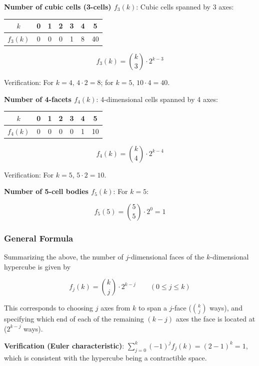 \documentclass[
  a4paper,11pt]{article}
\newcounter{none}
\theoremstyle{definition}
\theoremstyle{remark}
\begin{document}
\textbf{Number of cubic cells (3-cells) \(f_3(k)\)}: Cubic cells spanned
by 3 axes:

{\def\LTcaptype{none} %
\begin{longtable}[]{@{}ccccccc@{}}
\toprule\noalign{}
\(k\) & 0 & 1 & 2 & 3 & 4 & 5 \\
\midrule\noalign{}
\endhead
\bottomrule\noalign{}
\endlastfoot
\(f_3(k)\) & 0 & 0 & 0 & 1 & 8 & 40 \\
\end{longtable}
}

\[f_3(k) = \binom{k}{3} \cdot 2^{k-3}\]

Verification: For \(k=4\), \(4 \cdot 2 = 8\); for \(k=5\),
\(10 \cdot 4 = 40\).

\textbf{Number of 4-facets \(f_4(k)\)}: 4-dimensional cells spanned by 4
axes:

{\def\LTcaptype{none} %
\begin{longtable}[]{@{}ccccccc@{}}
\toprule\noalign{}
\(k\) & 0 & 1 & 2 & 3 & 4 & 5 \\
\midrule\noalign{}
\endhead
\bottomrule\noalign{}
\endlastfoot
\(f_4(k)\) & 0 & 0 & 0 & 0 & 1 & 10 \\
\end{longtable}
}

\[f_4(k) = \binom{k}{4} \cdot 2^{k-4}\]

Verification: For \(k=5\), \(5 \cdot 2 = 10\).

\textbf{Number of 5-cell bodies \(f_5(k)\)}: For \(k=5\):

\[f_5(5) = \binom{5}{5} \cdot 2^0 = 1\]

\subsubsection{General Formula}\label{general-formula}

Summarizing the above, the number of \(j\)-dimensional faces of the
\(k\)-dimensional hypercube is given by

\[f_j(k) = \binom{k}{j} \cdot 2^{k-j} \qquad (0 \leq j \leq k)\]

This corresponds to choosing \(j\) axes from \(k\) to span a \(j\)-face
(\(\binom{k}{j}\) ways), and specifying which end of each of the
remaining \((k-j)\) axes the face is located at (\(2^{k-j}\) ways).

\textbf{Verification (Euler characteristic)}:
\(\sum_{j=0}^{k} (-1)^j f_j(k) = (2-1)^k = 1\), which is consistent with
the hypercube being a contractible space.
\end{document}
